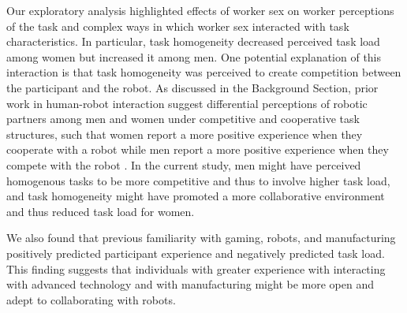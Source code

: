 Our exploratory analysis highlighted effects of worker sex on worker perceptions of the task and complex ways in which worker sex interacted with task characteristics. In particular, task homogeneity decreased perceived task load among women but increased it among men. One potential explanation of this interaction is that task homogeneity was  perceived to create competition between the participant and the robot. As discussed in the Background Section, prior work in human-robot interaction suggest differential perceptions of robotic partners among men and women under competitive and cooperative task structures, such that women report a more positive experience when they cooperate with a robot while men report a more positive experience when they compete with the robot \cite{mutlu2006task}. In the current study, men might have perceived homogenous tasks to be more competitive and thus to involve higher task load, and task homogeneity might have promoted a more collaborative environment and thus reduced task load for women.

We also found that previous familiarity with gaming, robots, and manufacturing positively predicted participant experience and negatively predicted task load. This finding suggests that individuals with greater experience with interacting with advanced technology and with manufacturing might be more open and adept to collaborating with robots. 